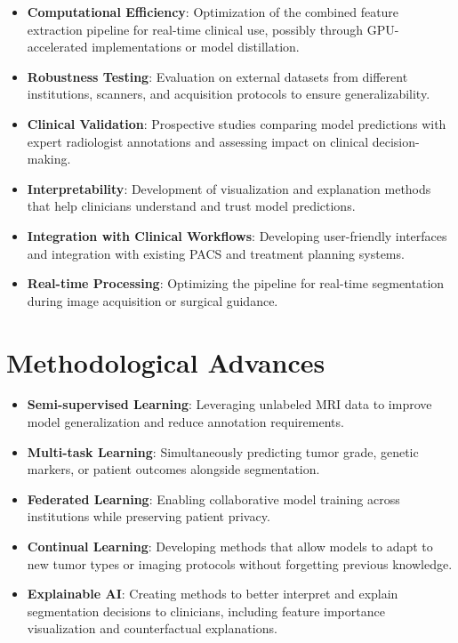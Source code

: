 \begin{itemize}
    \item \textbf{Computational Efficiency}: Optimization of the combined feature extraction pipeline for real-time clinical use, possibly through GPU-accelerated implementations or model distillation.
    
    \item \textbf{Robustness Testing}: Evaluation on external datasets from different institutions, scanners, and acquisition protocols to ensure generalizability.
    
    \item \textbf{Clinical Validation}: Prospective studies comparing model predictions with expert radiologist annotations and assessing impact on clinical decision-making.
    
    \item \textbf{Interpretability}: Development of visualization and explanation methods that help clinicians understand and trust model predictions.
    
    \item \textbf{Integration with Clinical Workflows}: Developing user-friendly interfaces and integration with existing PACS and treatment planning systems.
    
    \item \textbf{Real-time Processing}: Optimizing the pipeline for real-time segmentation during image acquisition or surgical guidance.
\end{itemize}

\section{Methodological Advances}

\begin{itemize}
    \item \textbf{Semi-supervised Learning}: Leveraging unlabeled MRI data to improve model generalization and reduce annotation requirements.
    
    \item \textbf{Multi-task Learning}: Simultaneously predicting tumor grade, genetic markers, or patient outcomes alongside segmentation.
    
    \item \textbf{Federated Learning}: Enabling collaborative model training across institutions while preserving patient privacy.
    
    \item \textbf{Continual Learning}: Developing methods that allow models to adapt to new tumor types or imaging protocols without forgetting previous knowledge.
    
    \item \textbf{Explainable AI}: Creating methods to better interpret and explain segmentation decisions to clinicians, including feature importance visualization and counterfactual explanations.
\end{itemize}

